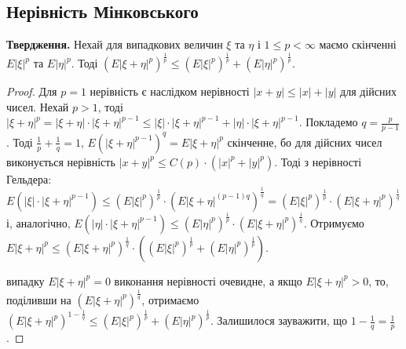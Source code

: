 \subsection{Нерівність Мінковського}
\noindent\textbf{Твердження.} Нехай для випадкових величин $\xi$ та $\eta$ і $1\leq p < \infty$ маємо скінченні
$E\left| \xi\right|^p$ та $E\left| \eta\right|^p$. Тоді
$\left(E\left| \xi + \eta\right|^p\right)^{\frac{1}{p}} \leq \left(E\left| \xi \right|^p\right)^{\frac{1}{p}}
+\left(E\left| \eta \right|^p\right)^{\frac{1}{p}}$.
\begin{proof}
    Для $p=1$ нерівність є наслідком нерівності $\left| x+y\right| \leq |x| + |y|$ для дійсних чисел.
    Нехай $p > 1$, тоді $\left| \xi + \eta\right|^p = |\xi + \eta| \cdot |\xi + \eta|^{p-1} \leq |\xi| \cdot |\xi + \eta|^{p-1} +
    |\eta| \cdot |\xi + \eta|^{p-1}$.
    Покладемо $q = \frac{p}{p-1}$. Тоді $\frac{1}{p} + \frac{1}{q} = 1$, $E\left(|\xi + \eta|^{p-1} \right)^{q} = E|\xi+ \eta|^p$ скінченне, бо 
    для дійсних чисел виконується нерівність $|x+y|^p \leq C(p) \cdot (|x|^p + |y|^p)$.
    Тоді з нерівності Гельдера: $E\left( |\xi|\cdot |\xi + \eta|^{p-1}\right) \leq
    \left( E|\xi|^p\right)^{\frac{1}{p}} \cdot \left( E |\xi + \eta|^{(p-1)q}\right)^{\frac{1}{q}} = 
    \left( E|\xi|^p\right)^{\frac{1}{p}} \cdot \left( E |\xi + \eta|^{p}\right)^{\frac{1}{q}}$ і,
    аналогічно, 
    $E\left( |\eta|\cdot |\xi + \eta|^{p-1}\right) \leq 
    \left( E|\eta|^p\right)^{\frac{1}{p}} \cdot \left( E |\xi + \eta|^{p}\right)^{\frac{1}{q}}$.
    Отримуємо $E\left| \xi + \eta\right|^p \leq \left( E |\xi + \eta|^{p}\right)^{\frac{1}{q}} \cdot 
    \left(\left(E|\xi|^p\right)^{\frac{1}{p}} + \left(E|\eta|^p\right)^{\frac{1}{p}}\right)$.
    
     випадку $E\left| \xi + \eta\right|^p = 0$ виконання нерівності очевидне, а якщо $E\left| \xi + \eta\right|^p > 0$, то, поділивши на 
    $\left( E |\xi + \eta|^{p}\right)^{\frac{1}{q}}$, отримаємо
    $\left(E\left| \xi + \eta\right|^p\right)^{1 - \frac{1}{q}} \leq  
    \left(E|\xi|^p\right)^{\frac{1}{p}} + \left(E|\eta|^p\right)^{\frac{1}{p}}$.
    Залишилося зауважити, що $1 - \frac{1}{q} = \frac{1}{p}$.
\end{proof}